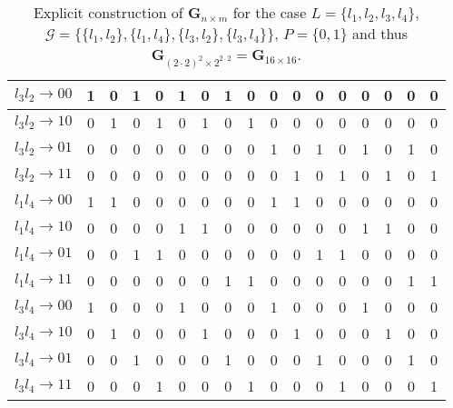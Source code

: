 \begin{table}[!ht]
\begin{tabular}{ r || c | c | c | c | c | c | c | c | c | c | c | c | c | c | c | c }
    $l_3 l_2 \rightarrow 00$ & 1 & 0 & 1 & 0 & 1 & 0 & 1 & 0 & 0 & 0 & 0 & 0 & 0 & 0 & 0 & 0\\ \hline
    $l_3 l_2 \rightarrow 10$ & 0 & 1 & 0 & 1 & 0 & 1 & 0 & 1 & 0 & 0 & 0 & 0 & 0 & 0 & 0 & 0\\ \hline
    $l_3 l_2 \rightarrow 01$ & 0 & 0 & 0 & 0 & 0 & 0 & 0 & 0 & 1 & 0 & 1 & 0 & 1 & 0 & 1 & 0\\ \hline
    $l_3 l_2 \rightarrow 11$ & 0 & 0 & 0 & 0 & 0 & 0 & 0 & 0 & 0 & 1 & 0 & 1 & 0 & 1 & 0 & 1\\ \hline

    $l_1 l_4 \rightarrow 00$ & 1 & 1 & 0 & 0 & 0 & 0 & 0 & 0 & 1 & 1 & 0 & 0 & 0 & 0 & 0 & 0\\ \hline
    $l_1 l_4 \rightarrow 10$ & 0 & 0 & 0 & 0 & 1 & 1 & 0 & 0 & 0 & 0 & 0 & 0 & 1 & 1 & 0 & 0\\ \hline
    $l_1 l_4 \rightarrow 01$ & 0 & 0 & 1 & 1 & 0 & 0 & 0 & 0 & 0 & 0 & 1 & 1 & 0 & 0 & 0 & 0\\ \hline
    $l_1 l_4 \rightarrow 11$ & 0 & 0 & 0 & 0 & 0 & 0 & 1 & 1 & 0 & 0 & 0 & 0 & 0 & 0 & 1 & 1\\ \hline

    $l_3 l_4 \rightarrow 00$ & 1 & 0 & 0 & 0 & 1 & 0 & 0 & 0 & 1 & 0 & 0 & 0 & 1 & 0 & 0 & 0\\ \hline
    $l_3 l_4 \rightarrow 10$ & 0 & 1 & 0 & 0 & 0 & 1 & 0 & 0 & 0 & 1 & 0 & 0 & 0 & 1 & 0 & 0\\ \hline
    $l_3 l_4 \rightarrow 01$ & 0 & 0 & 1 & 0 & 0 & 0 & 1 & 0 & 0 & 0 & 1 & 0 & 0 & 0 & 1 & 0\\ \hline
    $l_3 l_4 \rightarrow 11$ & 0 & 0 & 0 & 1 & 0 & 0 & 0 & 1 & 0 & 0 & 0 & 1 & 0 & 0 & 0 & 1\\
    \end{tabular}
\caption{Explicit construction of $\mathbf{G}_{n \times m}$ for the case $L = \{ l_1,l_2,l_3,l_4 \}$, $\mathcal{G} = \{\{l_1,l_2 \},\{l_1,l_4 \},\{l_3,l_2\},\{l_3,l_4\} \}$, $P=\{0,1\}$ and thus $\mathbf{G}_{(2 \cdot 2)^2 \times 2^{2 \cdot 2}} = \mathbf{G}_{16 \times 16}$.}
\label{tab:logmat222}
\end{table}
